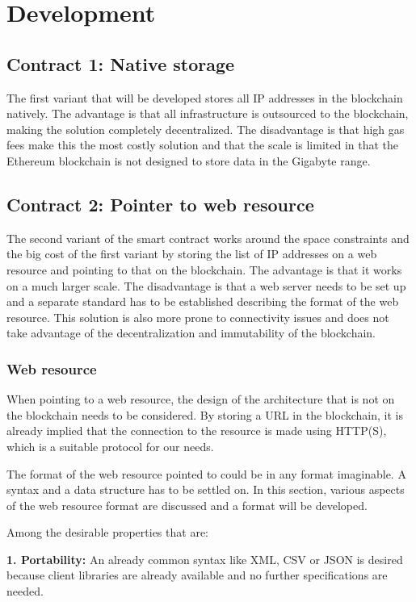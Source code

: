 \chapter{Development}

\section{Contract 1: Native storage}
The first variant that will be developed stores all IP addresses in the blockchain natively. The advantage is that all infrastructure is outsourced to the blockchain, making the solution completely decentralized. The disadvantage is that high gas fees make this the most costly solution and that the scale is limited in that the Ethereum blockchain is not designed to store data in the Gigabyte range.

\section{Contract 2: Pointer to web resource}
The second variant of the smart contract works around the space constraints and the big cost of the first variant by storing the list of IP addresses on a web resource and pointing to that on the blockchain. The advantage is that it works on a much larger scale. The disadvantage is that a web server needs to be set up and a separate standard has to be established describing the format of the web resource. This solution is also more prone to connectivity issues and does not take advantage of the decentralization and immutability of the blockchain.

\subsection{Web resource}
When pointing to a web resource, the design of the architecture that is not on the blockchain needs to be considered. By storing a URL in the blockchain, it is already implied that the connection to the resource is made using HTTP(S), which is a suitable protocol for our needs.

The format of the web resource pointed to could be in any format imaginable. A syntax and a data structure has to be settled on. In this section, various aspects of the web resource format are discussed and a format will be developed.

Among the desirable properties that are:

\textbf{1. Portability:} An already common syntax like XML, CSV or JSON is desired because client libraries are already available and no further specifications are needed.

